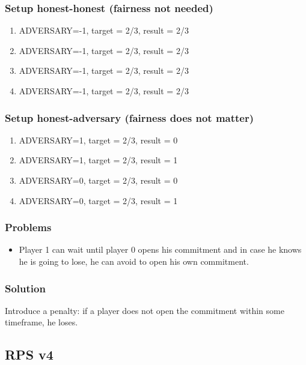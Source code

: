 \documentclass{article}
\begin{document}


\subsubsection{Setup honest-honest (fairness not needed)}

\begin{enumerate}
\item ADVERSARY=-1, target = 2/3, result = 2/3
\item ADVERSARY=-1, target = 2/3, result = 2/3
\item ADVERSARY=-1, target = 2/3, result = 2/3
\item ADVERSARY=-1, target = 2/3, result = 2/3
\end{enumerate}

\subsubsection{Setup honest-adversary (fairness does not matter)}

\begin{enumerate}
\item ADVERSARY=1, target = 2/3, result = 0
\item ADVERSARY=1, target = 2/3, result = 1
\item ADVERSARY=0, target = 2/3, result = 0
\item ADVERSARY=0, target = 2/3, result = 1
\end{enumerate}

\subsubsection{Problems}

\begin{itemize}
\item Player 1 can wait until player 0 opens his commitment and in case he knows he is going to lose, he can 
avoid to open his own commitment.
\end{itemize}

\subsubsection{Solution}
Introduce a penalty: if a player does not open the commitment within some timeframe, he loses.

\subsection{RPS v4}
\end{document}
